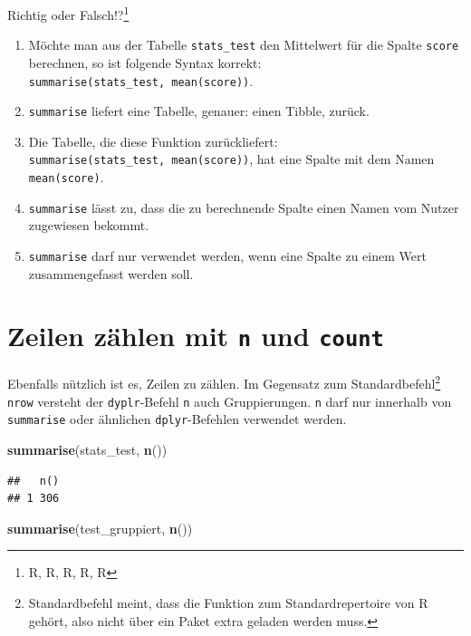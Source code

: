 \documentclass[12pt,ngerman,paper=a4,pagesize,DIV=13]{scrreprt}
\newenvironment{Shaded}{\begin{snugshade}}{\end{snugshade}}
\newcommand{\KeywordTok}[1]{\textcolor[rgb]{0.13,0.29,0.53}{\textbf{#1}}}
\newcommand{\NormalTok}[1]{#1}
\providecommand{\tightlist}{%
  \setlength{\itemsep}{0pt}\setlength{\parskip}{0pt}}
\begin{document}
Richtig oder Falsch!?\footnote{R, R, R, R, R}

\begin{enumerate}
\def\labelenumi{\arabic{enumi}.}
\tightlist
\item
  Möchte man aus der Tabelle \texttt{stats\_test} den Mittelwert für die
  Spalte \texttt{score} berechnen, so ist folgende Syntax korrekt:
  \texttt{summarise(stats\_test,\ mean(score))}.
\item
  \texttt{summarise} liefert eine Tabelle, genauer: einen Tibble,
  zurück.
\item
  Die Tabelle, die diese Funktion zurückliefert:
  \texttt{summarise(stats\_test,\ mean(score))}, hat eine Spalte mit dem
  Namen \texttt{mean(score)}.
\item
  \texttt{summarise} lässt zu, dass die zu berechnende Spalte einen
  Namen vom Nutzer zugewiesen bekommt.
\item
  \texttt{summarise} darf nur verwendet werden, wenn eine Spalte zu
  einem Wert zusammengefasst werden soll.
\end{enumerate}

\hypertarget{zeilen-zahlen-mit-n-und-count}{%
\section{\texorpdfstring{Zeilen zählen mit \texttt{n} und
\texttt{count}}{Zeilen zählen mit n und count}}\label{zeilen-zahlen-mit-n-und-count}}

Ebenfalls nützlich ist es, Zeilen zu zählen. Im Gegensatz zum
Standardbefehl\footnote{Standardbefehl meint, dass die Funktion zum
  Standardrepertoire von R gehört, also nicht über ein Paket extra
  geladen werden muss.} \texttt{nrow} versteht der \texttt{dyplr}-Befehl
\texttt{n} auch Gruppierungen. \texttt{n} darf nur innerhalb von
\texttt{summarise} oder ähnlichen \texttt{dplyr}-Befehlen verwendet
werden.

\begin{Shaded}
\begin{Highlighting}[]
\KeywordTok{summarise}\NormalTok{(stats_test, }\KeywordTok{n}\NormalTok{())}
\end{Highlighting}
\end{Shaded}

\begin{verbatim}
##   n()
## 1 306
\end{verbatim}

\begin{Shaded}
\begin{Highlighting}[]
\KeywordTok{summarise}\NormalTok{(test_gruppiert, }\KeywordTok{n}\NormalTok{())}
\end{Highlighting}
\end{Shaded}
\end{document}
